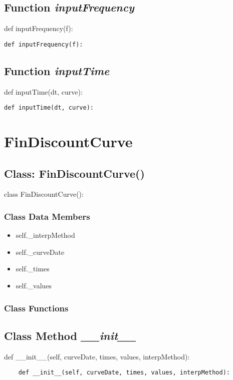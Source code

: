 \documentclass[twoside,11pt]{book}
\begin{document}
\subsection{Function {\it inputFrequency}}
def inputFrequency(f):

\begin{lstlisting}
def inputFrequency(f):
\end{lstlisting}

\subsection{Function {\it inputTime}}
def inputTime(dt, curve):

\begin{lstlisting}
def inputTime(dt, curve):
\end{lstlisting}

\newpage
\section{FinDiscountCurve}

\subsection{Class: FinDiscountCurve()}
class FinDiscountCurve():

\subsubsection{Class Data Members}
\begin{itemize}
\item{self.\_interpMethod}
\item{self.\_curveDate}
\item{self.\_times}
\item{self.\_values}
\end{itemize}

\subsubsection{Class Functions}

\subsection{Class Method {\it \_\_init\_\_}}
def \_\_init\_\_(self, curveDate, times, values, interpMethod):

\begin{lstlisting}
    def __init__(self, curveDate, times, values, interpMethod):
\end{lstlisting}
\end{document}
